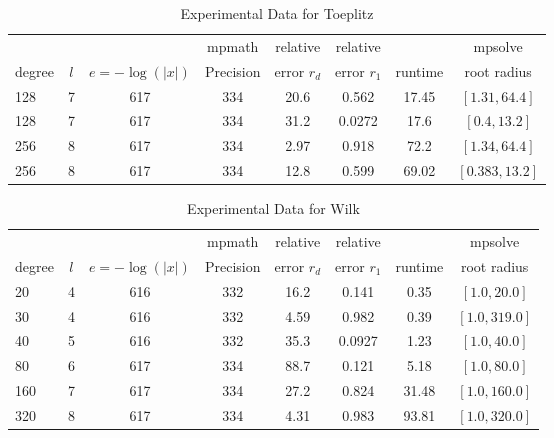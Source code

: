 \documentclass[sigconf]{acmart}
\begin{document}
\begin{table}[t]
\caption{Experimental Data for Toeplitz}
\label{tab:toep}
\vskip -0.15in
\begin{center}
\begin{small}
\begin{sc}
\begin{tabular}{lccccccc}
\toprule
&  &  & mpmath & relative  & relative &  & mpsolve \\
degree  & $l$& $e=-\log(|x|)$& Precision &error $r_d$       & error $r_1$ &runtime& root radius\\
\midrule
 128 & 7 & 617 & 334 & 20.6 & 0.562 & 17.45 & $[1.31, 64.4]$\\ %
  128 & 7 & 617 & 334 & 31.2 & 0.0272 & 17.6 & $[0.4, 13.2]$\\ %
 256 & 8 & 617 & 334 & 2.97 & 0.918 & 72.2 & $[1.34, 64.4]$\\ %
 256 & 8 & 617 & 334 & 12.8 & 0.599 & 69.02 & $[0.383, 13.2]$\\ %
\bottomrule
\end{tabular}
\end{sc}
\end{small}
\end{center}
\vskip 0.05in
\end{table}


\begin{table}[t]
\caption{Experimental Data for Wilk}
\label{tab:wilk}
\vskip -0.15in
\begin{center}
\begin{small}
\begin{sc}
\begin{tabular}{lccccccc}
\toprule
&  &  & mpmath & relative  & relative &  & mpsolve \\
degree  & $l$& $e=-\log(|x|)$& Precision &error $r_d$       & error $r_1$ &runtime& root radius\\
\midrule
 20 & 4 & 616 & 332 & 16.2 & 0.141 & 0.35 & $[1.0, 20.0]$\\
 30 & 4 & 616 & 332 & 4.59 & 0.982 & 0.39 & $[1.0, 319.0]$\\
 40 & 5 & 616 & 332 & 35.3 & 0.0927 & 1.23 & $[1.0, 40.0]$\\
 80 & 6 & 617 & 334 & 88.7 & 0.121 & 5.18 & $[1.0, 80.0]$\\
 160 & 7 & 617 & 334 & 27.2 & 0.824 & 31.48 & $[1.0, 160.0]$\\
 320 & 8 & 617 & 334 & 4.31 & 0.983 & 93.81 & $[1.0, 320.0]$\\
\bottomrule
\end{tabular}
\end{sc}
\end{small}
\end{center}
\vskip 0.05in
\end{table}
\end{document}
